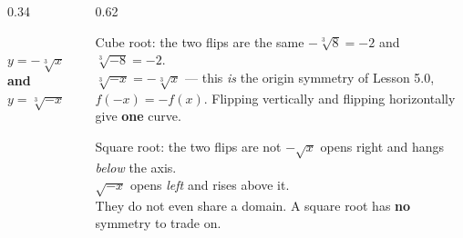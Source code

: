 \documentclass[aspectratio=169, 11pt]{beamer}
\newcommand{\lgrid}[4]{%
  \draw[step=1, linegray!45, thin] (#1,#3) grid (#2,#4);
  \draw[->, thick, charcoal] (#1,0)--(#2,0) node[below right, font=\tiny]{$x$};
  \draw[->, thick, charcoal] (0,#3)--(0,#4) node[left, font=\tiny]{$y$};}
\newcommand{\cbrtplot}[5]{%
  \draw[very thick, forest, domain=#2:#5, samples=70, smooth]
    plot (\x,{(#1)*pow((\x)-(#2),1/3)+(#3)});
  \draw[very thick, forest, domain=#4:#2, samples=70, smooth]
    plot (\x,{-(#1)*pow((#2)-(\x),1/3)+(#3)});}
\begin{document}
\begin{frame}[t, plain]
  \begin{columns}[T]
    \begin{column}{0.34\textwidth}
      \centering
      \\[2pt]
      {\scriptsize $y=-\sqrt[3]{x}$ \; \textbf{and} \; $y=\sqrt[3]{-x}$}
    \end{column}
    \begin{column}{0.62\textwidth}
      \footnotesize
      \begin{block}{Cube root: the two flips are the same}
        $-\sqrt[3]{8}=-2$ \quad and \quad $\sqrt[3]{-8}=-2$. \\[3pt]
        $\sqrt[3]{-x}=-\sqrt[3]{x}$ --- this \emph{is} the origin symmetry of Lesson 5.0,
        $f(-x)=-f(x)$. Flipping vertically and flipping horizontally give \textbf{one} curve.
      \end{block}
      \vspace{2pt}
      \begin{block}{Square root: the two flips are not}
        $-\sqrt{x}$ opens right and hangs \emph{below} the axis. \\
        $\sqrt{-x}$ opens \emph{left} and rises above it. \\[3pt]
        They do not even share a domain. A square root has \textbf{no} symmetry to trade on.
      \end{block}
    \end{column}
  \end{columns}
\end{frame}
\end{document}

